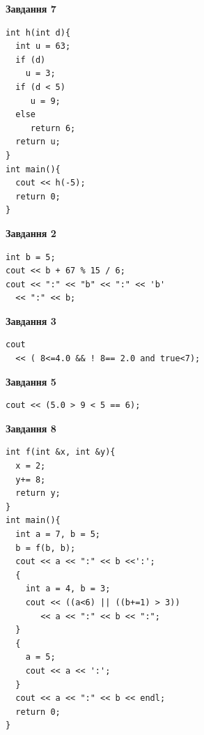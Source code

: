 \documentclass[12pt, ukrainian]{article}
\begin{document}
{\begin {large}
\begin{minipage}[t]{7.0cm}
\begin{center}
\textbf{Завдання 7}
\end{center}
\vspace{-8mm}

\begin{verbatim}
int h(int d){
  int u = 63;
  if (d)
    u = 3;
  if (d < 5)
     u = 9;
  else
     return 6;
  return u;
}
int main(){
  cout << h(-5);
  return 0;
}
\end{verbatim}

\end{minipage}
\vline \hspace{1mm}
\begin{minipage}[t]{11.0cm}

\begin{center}
\textbf{Завдання 2}
\end{center}
\vspace{-8mm}

\begin{verbatim}
int b = 5;
cout << b + 67 % 15 / 6;
cout << ":" << "b" << ":" << 'b' 
  << ":" << b;
\end{verbatim}



\begin{center}
\textbf{Завдання 3}
\end{center}
\vspace{-8mm}

\begin{verbatim}
cout 
  << ( 8<=4.0 && ! 8== 2.0 and true<7);
\end{verbatim}



\begin{center}
\textbf{Завдання 5}
\end{center}
\vspace{-8mm}

\begin{verbatim}
cout << (5.0 > 9 < 5 == 6);
\end{verbatim}



\begin{center}
\textbf{Завдання 8}
\end{center}
\vspace{-8mm}

\begin{verbatim}
int f(int &x, int &y){
  x = 2;
  y+= 8;
  return y;
}
int main(){
  int a = 7, b = 5;
  b = f(b, b);
  cout << a << ":" << b <<':';
  {
    int a = 4, b = 3;
    cout << ((a<6) || ((b+=1) > 3))
       << a << ":" << b << ":";
  }
  {
    a = 5;
    cout << a << ':';
  }
  cout << a << ":" << b << endl;
  return 0;
}
\end{verbatim}


\end{minipage}
\end{large}}
\end{document}
